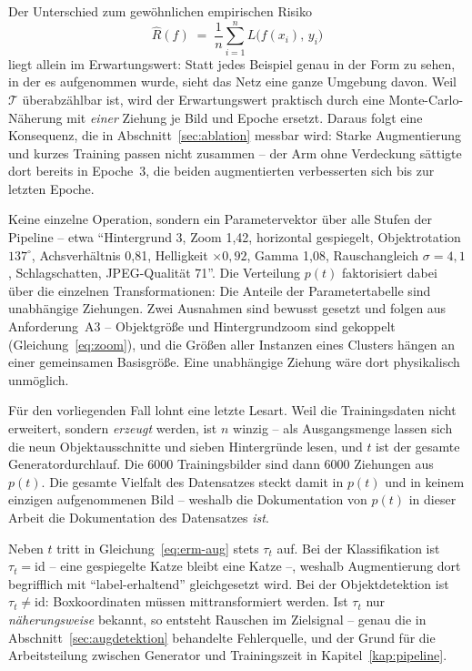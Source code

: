 Der Unterschied zum gewöhnlichen empirischen Risiko
\[
\hat{R}(f) \;=\; \frac{1}{n}\sum_{i=1}^{n} L\big(f(x_i),\, y_i\big)
\]
liegt allein im Erwartungswert: Statt jedes Beispiel genau in der Form zu sehen,
in der es aufgenommen wurde, sieht das Netz eine ganze Umgebung davon. Weil
$\mathcal{T}$ überabzählbar ist, wird der Erwartungswert praktisch durch eine
Monte-Carlo-Näherung mit \emph{einer} Ziehung je Bild und Epoche ersetzt. Daraus
folgt eine Konsequenz, die in Abschnitt~\ref{sec:ablation} messbar wird: Starke
Augmentierung und kurzes Training passen nicht zusammen -- der Arm ohne
Verdeckung sättigte dort bereits in Epoche~3, die beiden augmentierten
verbesserten sich bis zur letzten Epoche.

 Keine einzelne Operation,
sondern ein Parametervektor über alle Stufen der Pipeline -- etwa
\enquote{Hintergrund 3, Zoom 1,42, horizontal gespiegelt, Objektrotation
$137^\circ$, Achsverhältnis 0,81, Helligkeit $\times 0{,}92$, Gamma 1,08,
Rauschangleich $\sigma = 4{,}1$, Schlagschatten, JPEG-Qualität 71}. Die
Verteilung $p(t)$ faktorisiert dabei über die einzelnen Transformationen: Die
Anteile der Parametertabelle sind unabhängige Ziehungen. Zwei Ausnahmen sind
bewusst gesetzt und folgen aus Anforderung~A3 -- Objektgröße und
Hintergrundzoom sind gekoppelt (Gleichung~\eqref{eq:zoom}), und die Größen aller
Instanzen eines Clusters hängen an einer gemeinsamen Basisgröße. Eine
unabhängige Ziehung wäre dort physikalisch unmöglich.


Für den vorliegenden Fall lohnt eine letzte Lesart. Weil die Trainingsdaten
nicht erweitert, sondern \emph{erzeugt} werden, ist $n$ winzig -- als
Ausgangsmenge lassen sich die neun Objektausschnitte und sieben Hintergründe
lesen, und $t$ ist der gesamte Generatordurchlauf. Die 6000 Trainingsbilder sind
dann 6000 Ziehungen aus $p(t)$. Die gesamte Vielfalt des Datensatzes steckt
damit in $p(t)$ und in keinem einzigen aufgenommenen Bild -- weshalb die
Dokumentation von $p(t)$ in dieser Arbeit die Dokumentation des Datensatzes
\emph{ist}.

 Neben $t$ tritt in
Gleichung~\eqref{eq:erm-aug} stets $\tau_t$ auf. Bei der Klassifikation ist
$\tau_t = \mathrm{id}$ -- eine gespiegelte Katze bleibt eine Katze --, weshalb
Augmentierung dort begrifflich mit \enquote{label-erhaltend} gleichgesetzt wird.
Bei der Objektdetektion ist $\tau_t \neq \mathrm{id}$: Boxkoordinaten müssen
mittransformiert werden. Ist $\tau_t$ nur \emph{näherungsweise} bekannt, so
entsteht Rauschen im Zielsignal -- genau die in
Abschnitt~\ref{sec:augdetektion} behandelte Fehlerquelle, und der Grund für die
Arbeitsteilung zwischen Generator und Trainingszeit in
Kapitel~\ref{kap:pipeline}.

